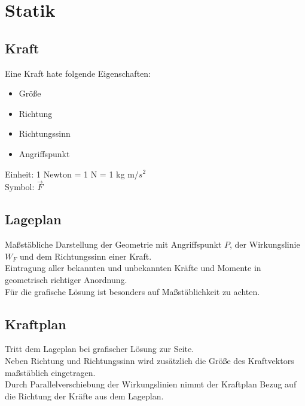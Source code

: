 \documentclass[a4paper,parskip=half*,DIV=7,fontsize=11pt]{scrartcl}
\begin{document}
	
	\pagebreak
	
	\section{Statik}
	\subsection{Kraft}
	Eine Kraft hate folgende Eigenschaften:\\
	\begin{itemize}
		\item Größe
		\item Richtung
		\item Richtungssinn
		\item Angriffspunkt
	\end{itemize}
	Einheit: 1 Newton = 1 N = 1 kg m/$s^2$\\
	Symbol: $\overrightarrow{F}$
	
	\subsection{Lageplan}
	Maßstäbliche Darstellung der Geometrie mit Angriffspunkt $P$, der Wirkungslinie $W_F$ und dem Richtungssinn einer Kraft.\\
	Eintragung aller bekannten und unbekannten Kräfte und Momente in geometrisch richtiger Anordnung.\\
	Für die grafische Lösung ist besonders auf Maßstäblichkeit zu achten.
	
	\subsection{Kraftplan}
	Tritt dem Lageplan bei grafischer Lösung zur Seite.\\
	Neben Richtung und Richtungssinn wird zusätzlich die Größe des Kraftvektors maßstäblich eingetragen.\\
	Durch Parallelverschiebung  der Wirkungslinien nimmt der Kraftplan Bezug auf die Richtung der Kräfte aus dem Lageplan.
	
\end{document}
